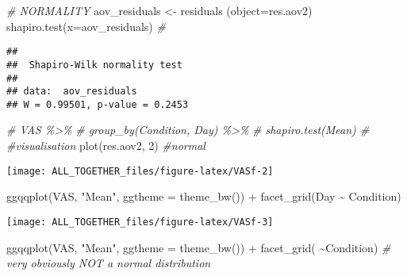 \documentclass[
]{article}
\newenvironment{Shaded}{\begin{snugshade}}{\end{snugshade}}
\newcommand{\AttributeTok}[1]{\textcolor[rgb]{0.77,0.63,0.00}{#1}}
\newcommand{\CommentTok}[1]{\textcolor[rgb]{0.56,0.35,0.01}{\textit{#1}}}
\newcommand{\DecValTok}[1]{\textcolor[rgb]{0.00,0.00,0.81}{#1}}
\newcommand{\FunctionTok}[1]{\textcolor[rgb]{0.00,0.00,0.00}{#1}}
\newcommand{\NormalTok}[1]{#1}
\newcommand{\OtherTok}[1]{\textcolor[rgb]{0.56,0.35,0.01}{#1}}
\newcommand{\SpecialCharTok}[1]{\textcolor[rgb]{0.00,0.00,0.00}{#1}}
\newcommand{\StringTok}[1]{\textcolor[rgb]{0.31,0.60,0.02}{#1}}
\begin{document}
\begin{Shaded}
\begin{Highlighting}[]
\CommentTok{\# NORMALITY}
\NormalTok{aov\_residuals }\OtherTok{\textless{}{-}} \FunctionTok{residuals}\NormalTok{ (}\AttributeTok{object=}\NormalTok{res.aov2)}
\FunctionTok{shapiro.test}\NormalTok{(}\AttributeTok{x=}\NormalTok{aov\_residuals) }\CommentTok{\#  }
\end{Highlighting}
\end{Shaded}

\begin{verbatim}
## 
##  Shapiro-Wilk normality test
## 
## data:  aov_residuals
## W = 0.99501, p-value = 0.2453
\end{verbatim}

\begin{Shaded}
\begin{Highlighting}[]
\CommentTok{\# VAS \%\textgreater{}\%}
\CommentTok{\#   group\_by(Condition, Day) \%\textgreater{}\%}
\CommentTok{\#   shapiro.test(Mean) \# }
\CommentTok{\#visualisation}
\FunctionTok{plot}\NormalTok{(res.aov2, }\DecValTok{2}\NormalTok{) }\CommentTok{\#normal}
\end{Highlighting}
\end{Shaded}

\texttt{[image: ALL\_TOGETHER\_files/figure-latex/VASf-2]}

\begin{Shaded}
\begin{Highlighting}[]
\FunctionTok{ggqqplot}\NormalTok{(VAS, }\StringTok{"Mean"}\NormalTok{, }\AttributeTok{ggtheme =} \FunctionTok{theme\_bw}\NormalTok{()) }\SpecialCharTok{+}
  \FunctionTok{facet\_grid}\NormalTok{(Day }\SpecialCharTok{\textasciitilde{}}\NormalTok{ Condition)}
\end{Highlighting}
\end{Shaded}

\texttt{[image: ALL\_TOGETHER\_files/figure-latex/VASf-3]}

\begin{Shaded}
\begin{Highlighting}[]
\FunctionTok{ggqqplot}\NormalTok{(VAS, }\StringTok{"Mean"}\NormalTok{, }\AttributeTok{ggtheme =} \FunctionTok{theme\_bw}\NormalTok{()) }\SpecialCharTok{+}
  \FunctionTok{facet\_grid}\NormalTok{( }\SpecialCharTok{\textasciitilde{}}\NormalTok{Condition) }\CommentTok{\#  very obviously NOT a normal distribution}
\end{Highlighting}
\end{Shaded}
\end{document}
